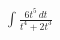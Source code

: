 \documentclass[preview]{standalone}
\begin{document}
\begin{align*}
\int \frac{6t^5\,dt}{t^4 + 2t^3}
\end{align*}
\end{document}
